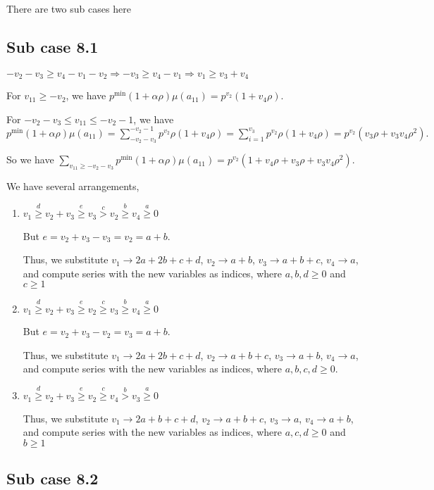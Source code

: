 \documentclass{article}
\begin{document}
There are two sub cases here

\subsection{Sub case 8.1}

$-v_2-v_3\geq{v_4-v_1-v_2}\Rightarrow{-v_3\geq{v_4-v_1}}\Rightarrow{v_1\geq{v_3+v_4}}$

For $v_{11}\geq{-v_2}$, we have $p^{\min}(1+\alpha\rho)\mu(a_{11})=p^{v_2}(1+v_4\rho).$

For $-v_2-v_3\leq{v_{11}}\leq{-v_2-1}$, we have $p^{\min}(1+\alpha\rho)\mu(a_{11})=\sum_{-v_2-v_3}^{-v_2-1}p^{v_2}\rho(1+v_4\rho)=\sum_{i=1}^{v_3}p^{v_2}\rho(1+v_4\rho)=p^{v_2}(v_3\rho+v_3v_4\rho^2).$

So we have $\sum_{v_{11}\geq{-v_2-v_3}}p^{\min}(1+\alpha\rho)\mu(a_{11})=p^{v_2}(1+v_4\rho+v_3\rho+v_3v_4\rho^2).$

We have several arrangements,
\begin{enumerate}
    \item 
$v_1\overset{d}{\geq}v_2+v_3\overset{e}{\geq}v_3\overset{c}{>}{v_2}\overset{b}{\geq}v_4\overset{a}{\geq}{0}$

But $e=v_2+v_3-v_3=v_2=a+b.$

Thus, we substitute $v_1\rightarrow{2a+2b+c+d}$, $v_2\rightarrow{a+b}$, $v_3\rightarrow{a+b+c}$, $v_4\rightarrow{a}$, and compute series with the new variables as indices, where $a,b,d\geq{0}$ and $c\geq{1}$  
    \item 
$v_1\overset{d}{\geq}v_2+v_3\overset{e}{\geq}v_2\overset{c}{\geq}{v_3}\overset{b}{\geq}v_4\overset{a}{\geq}{0}$

But $e=v_2+v_3-v_2=v_3=a+b.$

Thus, we substitute $v_1\rightarrow{2a+2b+c+d}$, $v_2\rightarrow{a+b+c}$, $v_3\rightarrow{a+b}$, $v_4\rightarrow{a}$, and compute series with the new variables as indices, where $a,b,c,d\geq{0}.$
    \item 
$v_1\overset{d}{\geq}v_2+v_3\overset{e}{\geq}v_2\overset{c}{\geq}{v_4}\overset{b}{>}v_3\overset{a}{\geq}{0}$

Thus, we substitute $v_1\rightarrow{2a+b+c+d}$, $v_2\rightarrow{a+b+c}$, $v_3\rightarrow{a}$, $v_4\rightarrow{a+b}$, and compute series with the new variables as indices, where $a,c,d\geq{0}$ and $b\geq{1}$
\end{enumerate}
\subsection{Sub case 8.2}
\end{document}
